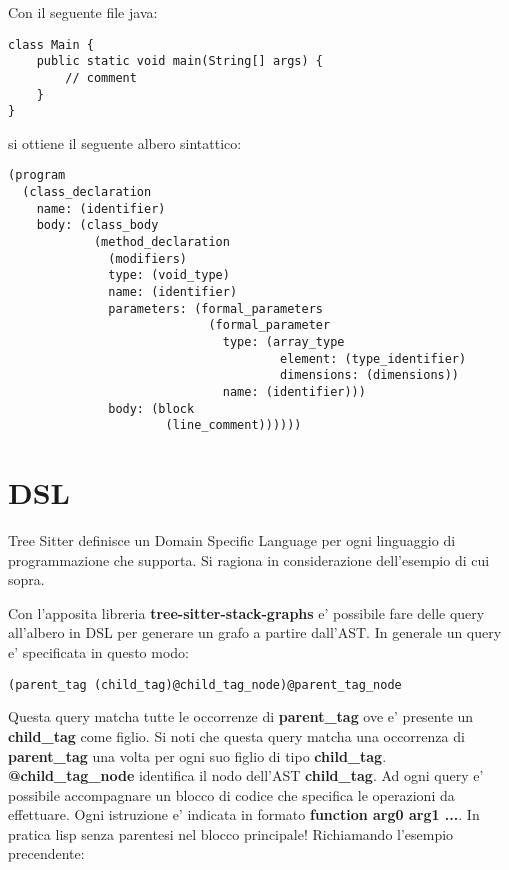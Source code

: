 Con il seguente file java:

\begin{verbatim}
class Main {
	public static void main(String[] args) {
    	// comment
    }
}
\end{verbatim}

si ottiene il seguente albero sintattico:

\begin{verbatim}
(program
  (class_declaration
    name: (identifier)
    body: (class_body
            (method_declaration
              (modifiers)
              type: (void_type)
              name: (identifier)
              parameters: (formal_parameters
                            (formal_parameter
                              type: (array_type
                                      element: (type_identifier)
                                      dimensions: (dimensions))
                              name: (identifier)))
              body: (block
                      (line_comment))))))
\end{verbatim}

\section{DSL}

Tree Sitter definisce un Domain Specific Language per ogni linguaggio di programmazione che supporta. Si ragiona in considerazione dell'esempio di cui sopra.

Con l'apposita libreria \textbf{tree-sitter-stack-graphs} e' possibile fare delle query all'albero in DSL per generare un grafo a partire dall'AST.
In generale un query e' specificata in questo modo:

\begin{verbatim}
(parent_tag (child_tag)@child_tag_node)@parent_tag_node
\end{verbatim}

Questa query matcha tutte le occorrenze di \textbf{parent\_tag} ove e' presente un \textbf{child\_tag} come figlio. Si noti che questa query matcha una occorrenza di \textbf{parent\_tag} una volta per ogni suo figlio di tipo \textbf{child\_tag}. \textbf{@child\_tag\_node} identifica il nodo dell'AST \textbf{child\_tag}.
Ad ogni query e' possibile accompagnare un blocco di codice che specifica le operazioni da effettuare. Ogni istruzione e' indicata in formato \textbf{function arg0 arg1 ...}. In pratica lisp senza parentesi nel blocco principale! Richiamando l'esempio precendente:

